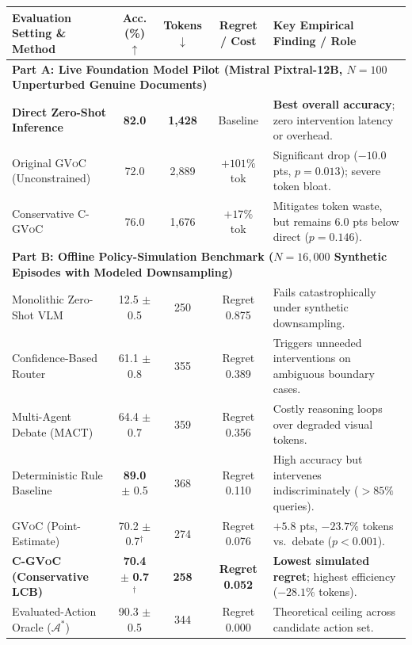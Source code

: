 \documentclass[11pt]{article}
\begin{document}
\begin{table}[t]
\centering
\footnotesize
\renewcommand{\arraystretch}{0.80}
\begin{tabularx}{\textwidth}{@{} p{3.8cm} c c c X @{}}
\toprule
\textbf{Evaluation Setting \& Method} & \textbf{Acc. (\%)} $\uparrow$ & \textbf{Tokens} $\downarrow$ & \textbf{Regret / Cost} & \textbf{Key Empirical Finding / Role} \\
\midrule
\multicolumn{5}{l}{\textbf{Part A: Live Foundation Model Pilot (Mistral Pixtral-12B, $N = 100$ Unperturbed Genuine Documents)}} \\
\textbf{Direct Zero-Shot Inference} & \textbf{82.0} & \textbf{1,428} & Baseline & \textbf{Best overall accuracy}; zero intervention latency or overhead. \\
Original \textsc{GVoC} (Unconstrained) & 72.0 & 2,889 & $+101\%$ tok & Significant drop ($-10.0$ pts, $p = 0.013$); severe token bloat. \\
Conservative C-\textsc{GVoC} & 76.0 & 1,676 & $+17\%$ tok & Mitigates token waste, but remains 6.0 pts below direct ($p = 0.146$). \\
\midrule
\multicolumn{5}{l}{\textbf{Part B: Offline Policy-Simulation Benchmark ($N = 16,000$ Synthetic Episodes with Modeled Downsampling)}} \\
Monolithic Zero-Shot VLM & 12.5 $\pm$ 0.5 & 250 & Regret 0.875 & Fails catastrophically under synthetic downsampling. \\
Confidence-Based Router & 61.1 $\pm$ 0.8 & 355 & Regret 0.389 & Triggers unneeded interventions on ambiguous boundary cases. \\
Multi-Agent Debate (MACT) & 64.4 $\pm$ 0.7 & 359 & Regret 0.356 & Costly reasoning loops over degraded visual tokens. \\
Deterministic Rule Baseline & \textbf{89.0} $\pm$ 0.5 & 368 & Regret 0.110 & High accuracy but intervenes indiscriminately ($>85\%$ queries). \\
\textsc{GVoC} (Point-Estimate) & 70.2 $\pm$ 0.7$^\dagger$ & 274 & Regret 0.076 & $+5.8$ pts, $-23.7\%$ tokens vs.\ debate ($p < 0.001$). \\
\textbf{C-\textsc{GVoC} (Conservative LCB)} & \textbf{70.4} $\pm$ \textbf{0.7}$^\dagger$ & \textbf{258} & \textbf{Regret 0.052} & \textbf{Lowest simulated regret}; highest efficiency ($-28.1\%$ tokens). \\
Evaluated-Action Oracle ($\mathcal{A}^*$) & 90.3 $\pm$ 0.5 & 344 & Regret 0.000 & Theoretical ceiling across candidate action set. \\

\end{tabularx}
\end{table}
\end{document}
